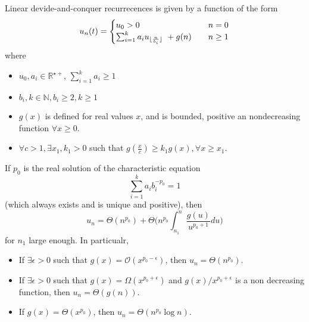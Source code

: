  Linear devide-and-conquer recurrecences is given by a function of the form\begin{equation}
 u_n(t) = 
 	\begin{cases}
			u_0 > 0 & n= 0 \\
			\sum_{i=1}^k a_i u_{\lfloor\frac{n}{b_i}\rfloor} \ + g(n) \quad &n  \geq 1 
	\end{cases}
 \end{equation}
 where
 \begin{itemize}
 \item $u_0, a_i \in \mathbb{R}^{\star+}$, $\sum_{i=1}^k a_i \geq 1$
 \item $b_{i}, k \in \mathbb{N}, b_i \geq 2, k\geq 1$
 \item $g(x)$ is defined for real values $x$, and is bounded, positive an nondecreasing function $\forall x\geq 0$.
 \item $\forall c > 1, \exists x_1, k_1 >0$ such that $g(\frac{x}{c}) \geq k_1 g(x), \forall x \geq x_1$. 
 \end{itemize}
 
 \begin{theorem}
 \label{thm:AkraAndBazzi}
 If $p_0$ is the real solution of the characteristic equation
 \begin{equation}
 \label{eq:characteristicequation}
 \sum_{i=1}^k a_i b_i ^{-p_0} = 1
 \end{equation}
 (which always exists and is unique and positive), then 
 \begin{equation}
 u_n = \Theta(n^{p_0}) + \Theta \Big( n^{p_0} \int_{n_1}^n \frac{g(u)}{u^{p_0+1}}  du \Big)
 \end{equation}
 for $n_1$ large enough. In particualr,
 \begin{itemize}
 \item If $\exists \epsilon >0$ such that $g(x)=\mathcal{O}(x^{p_0-\epsilon})$, then $u_n = \Theta (n^{p_0})$.
 \item If $\exists \epsilon > 0$ such that $g(x) = \Omega(x^{p_0 + \epsilon})$ and $g(x)/ x^{p_0+\epsilon}$ is a non decreasing function, then $u_n = \Theta(g(n))$.
 \item If $g(x) = \Theta(x^{p_0})$, then $u_{n} = \Theta(n^{p_0} \log n)$. 
 \end{itemize}
 \end{theorem}
 
